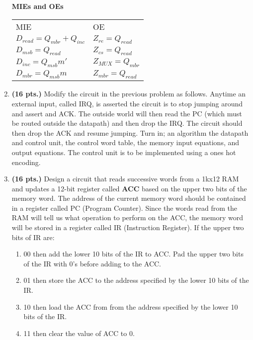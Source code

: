 \begin{enumerate}
\begin{onlysolution}[fragile]
            \textbf{ MIEs and OEs}

            \begin{tabular}{ll}
                MIE                         & OE                   \\
                $D_{read}= Q_{mbr}+Q_{inc}$ & $Z_{re} = Q_{read}$  \\
                $D_{msb} = Q_{read}$        & $Z_{cs} = Q_{read}$  \\
                $D_{inc}= Q_{msb} m'$       & $Z_{MUX} = Q_{mbr}$  \\
                $D_{mbr}= Q_{msb} m$        & $Z_{mbr} = Q_{read}$ \\
            \end{tabular}
        \end{onlysolution}

    \item \textbf{ (16 pts.)}
        Modify the circuit in the previous problem as follows.  Anytime
        an external input, called IRQ, is asserted the circuit is to stop
        jumping around and assert and ACK.  The outside world will then read
        the PC (which must be routed outside the datapath) and then drop the
        IRQ.  The circuit should then drop the ACK and resume jumping.
        Turn in; an algorithm the datapath and control unit, the control word
        table, the memory input equations, and output equations.
        The control unit is to be implemented using a ones hot encoding.

    \item  \textbf{ (16 pts.)} Design a circuit that reads successive words from
        a 1kx12 RAM and
        updates a 12-bit register called \textbf{ ACC} based on the upper two bits of the
        memory word.  The address of the current memory word should be contained
        in a register called PC (Program Counter).  Since the words read from the
        RAM will tell us what operation to perform on the ACC, the memory word will
        be stored in a register called IR (Instruction Register).  If the upper
        two bits of IR are:
        \begin{enumerate}
            \item  00 then add the lower 10 bits of the IR to ACC.  Pad the upper two
                bits of the IR with 0's before adding to the ACC.
            \item  01 then store the ACC to the address specified by the
                lower 10 bits of the IR.
            \item  10 then load the ACC from from the address specified by the lower
                10 bits of the IR.
            \item  11 then clear the value of ACC to 0.
        \end{enumerate}


\end{enumerate}
